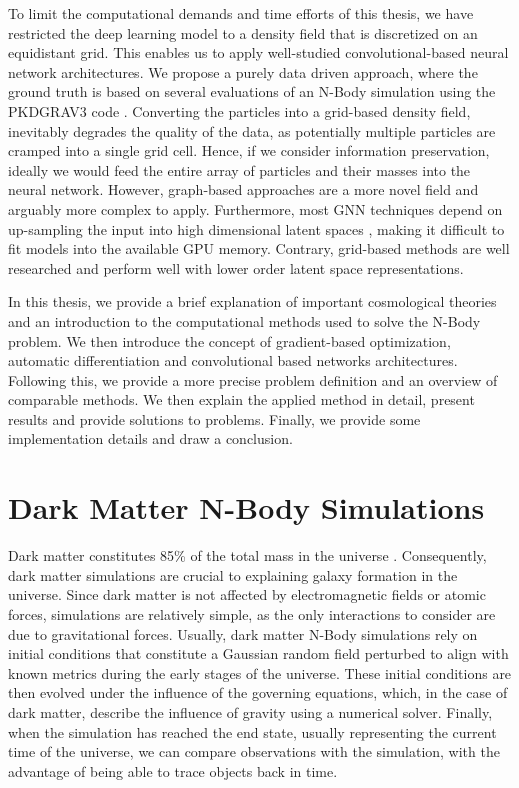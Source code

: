 \documentclass{article}
\begin{document}
To limit the computational demands and time efforts of this thesis, we have restricted the deep learning model to a density field that is discretized on an equidistant grid. This enables us to apply well-studied convolutional-based neural network architectures. We propose a purely data driven approach, where the ground truth is based on several evaluations of an N-Body simulation using the PKDGRAV3 code \citep{potter2017pkdgrav3}. Converting the particles into a grid-based density field, inevitably degrades the quality of the data, as potentially multiple particles are cramped into a single grid cell. Hence, if we consider information preservation, ideally we would feed the entire array of particles and their masses into the neural network. However, graph-based approaches are a more novel field and arguably more complex to apply. Furthermore, most GNN techniques depend on up-sampling the input into high dimensional latent spaces \citep{wu2020comprehensive}, making it difficult to fit models into the available GPU memory. Contrary, grid-based methods are well researched and perform well with lower order latent space representations.

In this thesis, we provide a brief explanation of important cosmological theories and an introduction to the computational methods used to solve the N-Body problem. We then introduce the concept of gradient-based optimization, automatic differentiation and convolutional based networks architectures. Following this, we provide a more precise problem definition and an overview of comparable methods. We then explain the applied method in detail, present results and provide solutions to problems. Finally, we provide some implementation details and draw a conclusion.

\newpage


\section{Dark Matter N-Body Simulations}
Dark matter constitutes 85\% of the total mass in the universe \citep{carroll2007dark}. Consequently, dark matter simulations are crucial to explaining galaxy formation in the universe. Since dark matter is not affected by electromagnetic fields or atomic forces, simulations are relatively simple, as the only interactions to consider are due to gravitational forces. Usually, dark matter N-Body simulations rely on initial conditions that constitute a Gaussian random field perturbed to align with known metrics during the early stages of the universe. These initial conditions are then evolved under the influence of the governing equations, which, in the case of dark matter, describe the influence of gravity using a numerical solver. Finally, when the simulation has reached the end state, usually representing the current time of the universe, we can compare observations with the simulation, with the advantage of being able to trace objects back in time.
\end{document}
